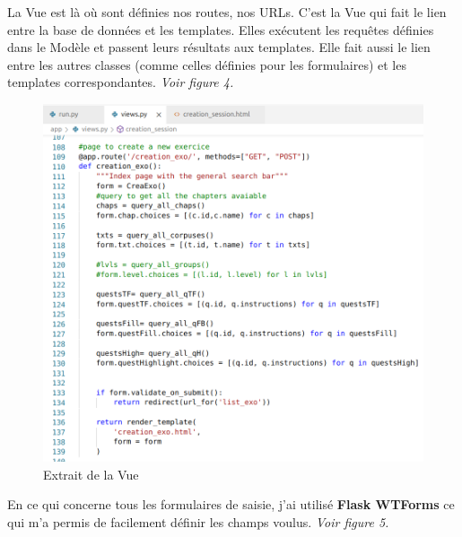 \documentclass[12pt]{article}
\begin{document}
La Vue est là où sont définies nos routes, nos URLs. C'est la Vue qui fait le lien entre la base de données et les templates. Elles exécutent les requêtes définies dans le Modèle et passent leurs résultats aux templates. Elle fait aussi le lien entre les autres classes (comme celles définies pour les formulaires) et les templates correspondantes. \textit{Voir figure 4.}

\begin{figure}[h]
    \centering
    \includegraphics[scale=0.3]{ex_views.png}
    \caption{Extrait de la Vue}
    \label{fig:ex_views}
\end{figure}


En ce qui concerne tous les formulaires de saisie, j'ai utilisé \textbf{Flask WTForms} ce qui m'a permis de facilement définir  les champs voulus. \textit{Voir figure 5.}
\end{document}
